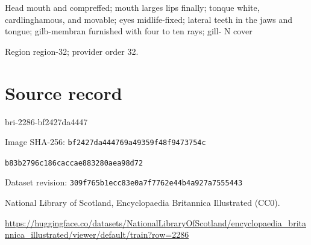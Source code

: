 \documentclass[11pt]{article}
\begin{document}
Head mouth and compreffed; mouth larges lips finally;
tonque white, cardlinghamous, and movable; eyes
midlife-fixed; lateral teeth in the jaws and tongue;
gilb-membran furnished with four to ten rays; gill-
N cover
\par

{\scriptsize\color{gray} Region region-32; provider order 32.\par}
\medskip
\newpage\section*{Source record}
bri-2286-bf2427da4447\par
Image SHA-256: \texttt{bf2427da444769a49359f48f9473754c}\par\texttt{b83b2796c186caccae883280aea98d72}\par
Dataset revision: \texttt{309f765b1ecc83e0a7f7}\texttt{762e44b4a927a7555443}\par
National Library of Scotland, Encyclopaedia Britannica Illustrated (CC0).\par
\url{https://huggingface.co/datasets/NationalLibraryOfScotland/encyclopaedia_britannica_illustrated/viewer/default/train?row=2286}
\end{document}
